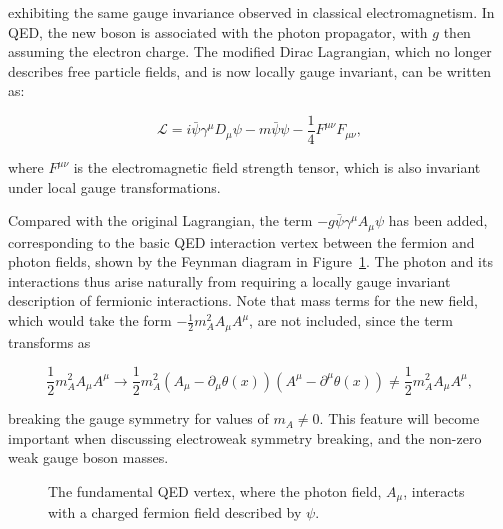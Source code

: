 \noindent exhibiting the same gauge invariance observed in classical electromagnetism. In QED, the new boson is associated with the photon propagator, with $g$ then assuming the electron charge. The modified Dirac Lagrangian, which no longer describes free particle fields, and is now locally gauge invariant, can be written as:

\begin{equation}
    \mathcal{L} = i\bar{\psi}\gamma^{\mu}D_{\mu}\psi - m\bar{\psi}\psi - \frac{1}{4}F^{\mu\nu}F_{\mu\nu},
\end{equation}

\noindent where $F^{\mu\nu}$ is the electromagnetic field strength tensor, which is also invariant under local gauge transformations. %

Compared with the original Lagrangian, the term $-g\bar{\psi}\gamma^{\mu}A_\mu\psi$ has been added, corresponding to the basic QED interaction vertex between the fermion and photon fields, shown by the Feynman diagram in Figure~\ref{fig:theory_qed_vertex}. The photon and its interactions thus arise naturally from requiring a locally gauge invariant description of fermionic interactions. Note that mass terms for the new field, which would take the form $-\frac{1}{2}m_{A}^{2}A_{\mu}A^{\mu}$, are not included, since the term transforms as 

\begin{equation}
    \frac{1}{2}m_{A}^{2}A_{\mu}A^{\mu} \rightarrow \frac{1}{2}m_{A}^{2}\left(A_{\mu} - \partial_{\mu}\theta(x)\right)\left(A^{\mu} - \partial^{\mu}\theta(x)\right) \neq \frac{1}{2}m_{A}^{2}A_{\mu}A^{\mu},
\end{equation}

\noindent breaking the gauge symmetry for values of $m_{A}\neq 0$. This feature will become important when discussing electroweak symmetry breaking, and the non-zero weak gauge boson masses. %

\begin{figure}[htb]
  \centering
  \caption[The fundamental QED interaction vertex.]{The fundamental QED vertex, where the photon field, $A_{\mu}$, interacts with a charged fermion field described by $\psi$.}
  \label{fig:theory_qed_vertex}
\end{figure}


